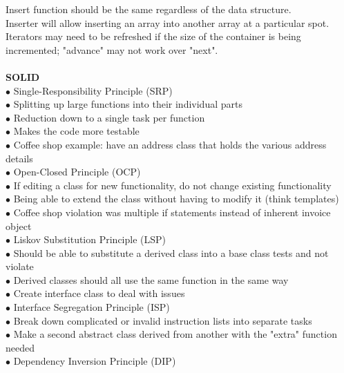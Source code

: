 \documentclass[11pt]{article}
\begin{document}
\indent Insert function should be the same regardless of the data structure.\\
\indent Inserter will allow inserting an array into another array at a particular spot.\\
\indent Iterators may need to be refreshed if the size of the container is being incremented; "advance" may
not work over "next".\\
\\
\textbf{SOLID} \\
\indent $\bullet$ Single-Responsibility Principle (SRP) \\
\indent\indent $\bullet$ Splitting up large functions into their individual parts \\
\indent\indent $\bullet$ Reduction down to a single task per function \\
\indent\indent $\bullet$ Makes the code more testable \\
\indent\indent $\bullet$ Coffee shop example: have an address class that holds the various address details \\
\indent $\bullet$ Open-Closed Principle (OCP) \\
\indent\indent $\bullet$ If editing a class for new functionality, do not change existing functionality \\
\indent\indent $\bullet$ Being able to extend the class without having to modify it (think templates) \\
\indent\indent $\bullet$ Coffee shop violation was multiple if statements instead of inherent invoice object \\
\indent $\bullet$ Liskov Substitution Principle (LSP) \\
\indent\indent $\bullet$ Should be able to substitute a derived class into a base class tests and not violate \\
\indent\indent $\bullet$ Derived classes should all use the same function in the same way \\
\indent\indent $\bullet$ Create interface class to deal with issues \\
\indent $\bullet$ Interface Segregation Principle (ISP) \\
\indent\indent $\bullet$ Break down complicated or invalid instruction lists into separate tasks \\
\indent\indent $\bullet$ Make a second abstract class derived from another with the "extra" function needed \\
\indent $\bullet$ Dependency Inversion Principle (DIP) \\
\end{document}

